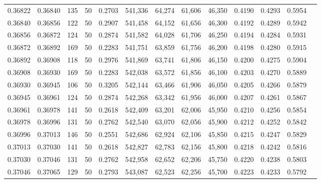 \begin{tabular}{rrrrrrrrrrrrr}
0.36822 & 0.36840 &   135 &  50 &                                     0.2703 & 541,336 &  64,274 &  61,606 &  46,350 & 0.4190 & 0.4293 & 0.5954 \\
0.36840 & 0.36856 &   122 &  50 &                                     0.2907 & 541,458 &  64,152 &  61,656 &  46,300 & 0.4192 & 0.4289 & 0.5942 \\
0.36856 & 0.36872 &   124 &  50 &                                     0.2874 & 541,582 &  64,028 &  61,706 &  46,250 & 0.4194 & 0.4284 & 0.5931 \\
0.36872 & 0.36892 &   169 &  50 &                                     0.2283 & 541,751 &  63,859 &  61,756 &  46,200 & 0.4198 & 0.4280 & 0.5915 \\
0.36892 & 0.36908 &   118 &  50 &                                     0.2976 & 541,869 &  63,741 &  61,806 &  46,150 & 0.4200 & 0.4275 & 0.5904 \\
0.36908 & 0.36930 &   169 &  50 &                                     0.2283 & 542,038 &  63,572 &  61,856 &  46,100 & 0.4203 & 0.4270 & 0.5889 \\
0.36930 & 0.36945 &   106 &  50 &                                     0.3205 & 542,144 &  63,466 &  61,906 &  46,050 & 0.4205 & 0.4266 & 0.5879 \\
0.36945 & 0.36961 &   124 &  50 &                                     0.2874 & 542,268 &  63,342 &  61,956 &  46,000 & 0.4207 & 0.4261 & 0.5867 \\
0.36961 & 0.36978 &   141 &  50 &                                     0.2618 & 542,409 &  63,201 &  62,006 &  45,950 & 0.4210 & 0.4256 & 0.5854 \\
0.36978 & 0.36996 &   131 &  50 &                                     0.2762 & 542,540 &  63,070 &  62,056 &  45,900 & 0.4212 & 0.4252 & 0.5842 \\
0.36996 & 0.37013 &   146 &  50 &                                     0.2551 & 542,686 &  62,924 &  62,106 &  45,850 & 0.4215 & 0.4247 & 0.5829 \\
0.37013 & 0.37030 &   141 &  50 &                                     0.2618 & 542,827 &  62,783 &  62,156 &  45,800 & 0.4218 & 0.4242 & 0.5816 \\
0.37030 & 0.37046 &   131 &  50 &                                     0.2762 & 542,958 &  62,652 &  62,206 &  45,750 & 0.4220 & 0.4238 & 0.5803 \\
0.37046 & 0.37065 &   129 &  50 &                                     0.2793 & 543,087 &  62,523 &  62,256 &  45,700 & 0.4223 & 0.4233 & 0.5792 \\

\end{tabular}
